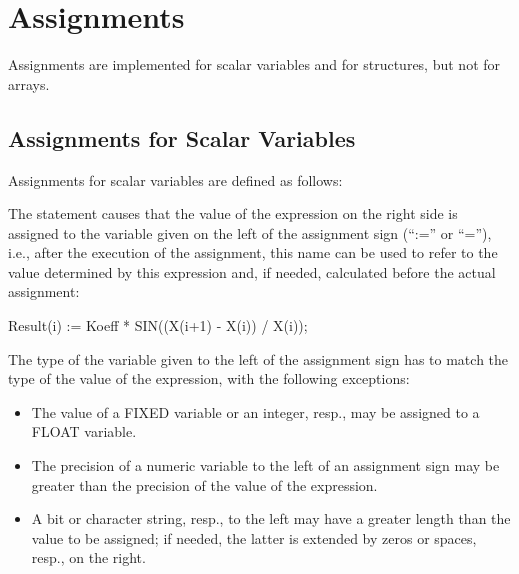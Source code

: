 
\section{Assignments}   %
\label{sec_assignments}

Assignments are implemented for scalar variables and for structures, but
not for arrays.



\subsection{Assignments for Scalar Variables}   %

Assignments for scalar variables are defined as follows:



The statement causes that the value of the expression on the right side
is assigned to the variable given on the left of the assignment sign
(``:='' or ``=''), i.e., after the execution of the assignment, this
name can be used to refer to the value determined by this expression
and, if needed, calculated before the actual assignment:

Result(i) := Koeff * SIN((X(i+1) - X(i)) / X(i));

The type of the variable given to the left of the assignment sign has to
match the type of the value of the expression, with the following
exceptions:
\begin{itemize}
\item The value of a FIXED variable or an integer, resp., may be
assigned to a FLOAT variable.
\item The precision of a numeric variable to the left of an assignment
sign may be greater than the precision of the value of the expression.
\item A bit or character string, resp., to the left may have a greater
length than the value to be assigned; if needed, the latter is extended
by zeros or spaces, resp., on the right.
\end{itemize}


